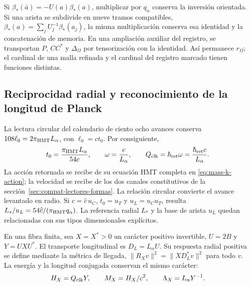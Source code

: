 Si \(\beta_*(\bar a)=-U(a)\beta_*(a)\), multiplicar por
\(q_\alpha\) conserva la inversión orientada. Si una arista se
subdivide en nueve tramos compatibles,
\(\beta_*(a)=\sum_jU_j^{-1}\beta_*(a_j)\), la misma
multiplicación conserva esa identidad y la concatenación de memoria.
En una ampliación auxiliar del registro, se transportan
\(P\), \(CC^*\) y \(\Delta_\Omega\) por tensorización
con la identidad. Así permanece \(r_\Omega\); el cardinal de
una malla refinada y el cardinal del registro marcado tienen funciones
distintas.

\subsection{Reciprocidad radial y reconocimiento de la longitud de Planck}
\label{rev5:radial}

La lectura circular del calendario de ciento ocho avances conserva
\(108\ell_0=2\pi_{\rm HMT}L_\alpha\), con
\(\ell_0=ct_0\). Por consiguiente,
\begin{equation}
 t_0=\frac{\pi_{\rm HMT}L_\alpha}{54c},\qquad
 \omega=\frac{c}{L_\alpha},\qquad
 Q_{\rm clk}=\hbar_{\rm ret}\omega
 =\frac{\hbar_{\rm ret}c}{L_\alpha}.
 \label{rev5:reloj}
\end{equation}
La acción retornada se recibe de su ecuación HMT completa en
\eqref{eq:mass-k-action}; la velocidad se recibe de los dos canales
constitutivos de la sección~\ref{sec:compat-lectores-formas}.
La relación circular convierte el avance levantado en radio. Si
\(c=\widehat c\,u_C\), \(t_0=u_T\) y
\(u_L=u_Cu_T\), resulta
\(L_*/u_L=54\widehat c/(\pi_{\rm HMT}q_\alpha)\).
La referencia radial \(L_*\) y la base de arista \(u_L\)
quedan relacionadas con sus tipos dimensionales explícitos.

En una fibra finita, sea \(X=X^*>0\) un carácter positivo
invertible, \(U=2B\) y \(Y=UXU^*\). El transporte
longitudinal es \(D_L=L_\alpha U\). Su respuesta radial positiva
se define mediante la métrica de llegada,
\(\|R_Xv\|^2=\|XD_L^*v\|^2\) para todo \(v\).
La energía y la longitud conjugada conservan el mismo carácter:
\[
 H_X=Q_{\rm clk}Y,\qquad M_X=H_X/c^2,\qquad
 \Lambda_X=L_\alpha Y^{-1}.
\]

